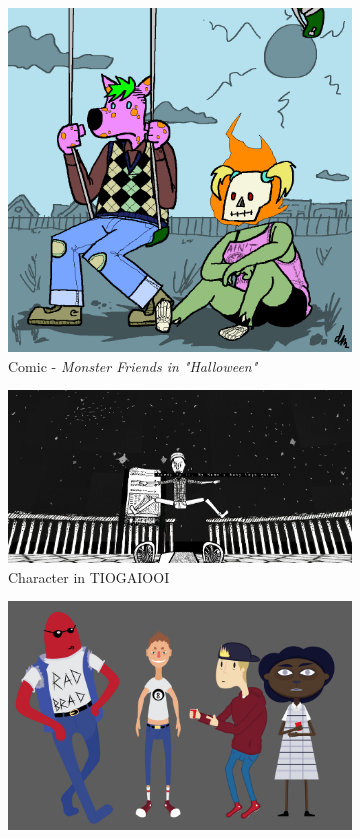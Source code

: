 \begin{figure}[H]
\begin{subfigure}{.4\textwidth}
    \centering
    \includegraphics[width=.9\linewidth]{images/ref_IAN01}
  	\caption{Comic - \textit{Monster Friends in "Halloween"}}
  \label{fig:i1}
  \end{subfigure}
  \begin{subfigure}{.5\textwidth}
    \centering
    \includegraphics[width=.9\linewidth]{images/ref_MICHAEL03}
    \caption{Character in TIOGAIOOI}
    \label{fig:m3}
  \end{subfigure}
  \begin{subfigure}{.45\textwidth}
    \centering
    \includegraphics[width=.9\linewidth]{images/ref_MICHAEL04}

\end{subfigure}
\end{figure}
